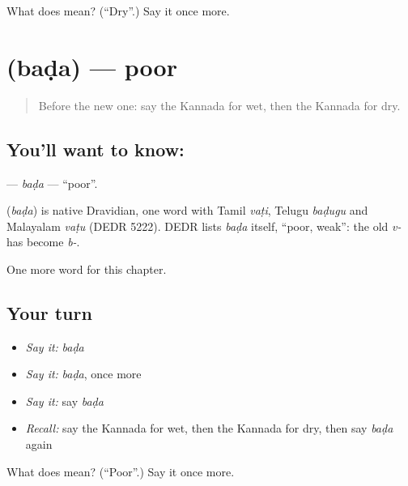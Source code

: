 \begin{tcolorbox}[breakable,colback=teal!4,colframe=teal!35!black,title={Before you move on}]
What does  mean? (\textquotedblleft{}Dry\textquotedblright{}.) Say it once more.
\end{tcolorbox}
\section[\texorpdfstring{\kn{ಬಡ} (baḍa)}{ಬಡ (baḍa)}]{ (baḍa) — poor}

\label{lesson:KA-C143-bada}



\begin{quote}
Before the new one: say the Kannada for wet, then the Kannada for dry.
\end{quote}

\subsection*{You'll want to know: }
\textbf{} — \emph{baḍa} — \textquotedblleft{}poor\textquotedblright{}.

\begin{cousinweb}
\textbf{} (\emph{baḍa}) is native Dravidian, one word with Tamil \emph{vaṭi}, Telugu \emph{baḍugu} and Malayalam \emph{vaṭu} (DEDR 5222). DEDR lists \emph{baḍa} itself, \textquotedblleft{}poor, weak\textquotedblright{}: the old \emph{v-} has become \emph{b-}.
\end{cousinweb}

\begin{grammarlens}[title={What you've built}]
One more word for this chapter.
\end{grammarlens}

\subsection*{Your turn}
\begin{itemize}
\raggedright
  \item \emph{Say it:} \emph{baḍa}
  \item \emph{Say it:} \emph{baḍa}, once more
  \item \emph{Say it:} say \emph{baḍa}
  \item \emph{Recall:} say the Kannada for wet, then the Kannada for dry, then say \emph{baḍa} again
\end{itemize}

\begin{tcolorbox}[breakable,colback=teal!4,colframe=teal!35!black,title={Before you move on}]
What does  mean? (\textquotedblleft{}Poor\textquotedblright{}.) Say it once more.
\end{tcolorbox}
